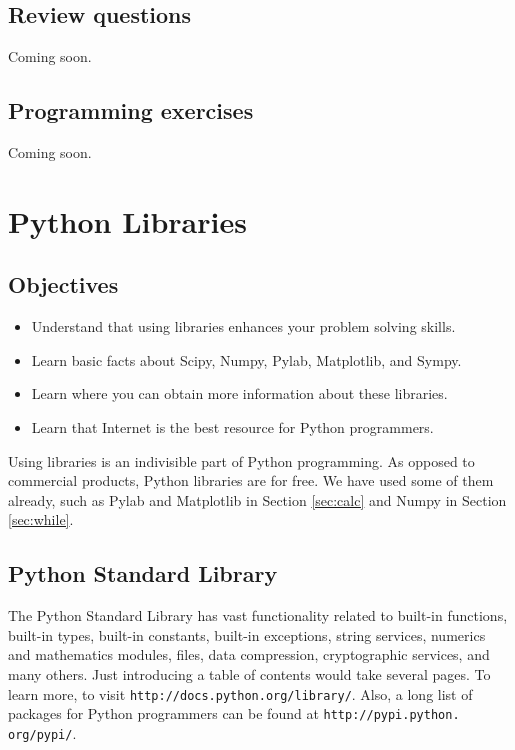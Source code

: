 \subsection{Review questions}

Coming soon.

\subsection{Programming exercises}

Coming soon.


\section{Python Libraries}\label{subsec:importinglib}

\subsection{Objectives}

\begin{itemize}
\item Understand that using libraries enhances your problem solving skills.
\item Learn basic facts about Scipy, Numpy, Pylab, Matplotlib, and Sympy.
\item Learn where you can obtain more information about these libraries.
\item Learn that Internet is the best resource for Python programmers.
\end{itemize}
Using libraries is an indivisible part of Python programming. As opposed to 
commercial products, Python libraries are for free. We have used some of them
already, such as Pylab and Matplotlib in Section \ref{sec:calc} and Numpy 
in Section \ref{sec:while}. 

\subsection{Python Standard Library}

The Python Standard Library has vast functionality related to 
built-in functions, built-in types, built-in constants, built-in
exceptions, string services, numerics and mathematics modules, files,
data compression, cryptographic services, and many others. Just introducing 
a table of contents would take several pages. To learn more,
to visit {\tt http://docs.python.org/library/}. Also, a long list of packages for Python 
programmers can be found at {\tt http://pypi.python. org/pypi/}.

